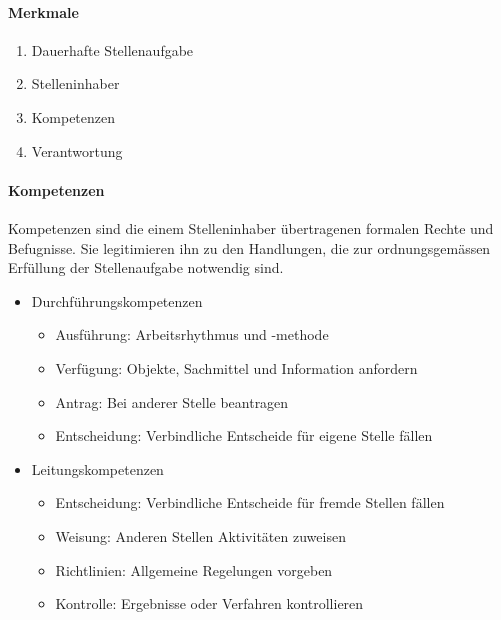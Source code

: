 \paragraph{Merkmale}
\begin{enumerate}
	\item Dauerhafte Stellenaufgabe
	\item Stelleninhaber
	\item Kompetenzen
	\item Verantwortung
\end{enumerate}

\paragraph{Kompetenzen}
Kompetenzen sind die einem Stelleninhaber übertragenen formalen Rechte und Befugnisse. Sie legitimieren ihn zu den
Handlungen, die zur ordnungsgemässen Erfüllung der Stellenaufgabe notwendig sind.
\begin{itemize}
	\item Durchführungskompetenzen
	\begin{itemize}
		\item Ausführung: Arbeitsrhythmus und -methode
		\item Verfügung: Objekte, Sachmittel und Information anfordern
		\item Antrag: Bei anderer Stelle beantragen
		\item Entscheidung: Verbindliche Entscheide für eigene Stelle fällen
	\end{itemize}
	\item Leitungskompetenzen
	\begin{itemize}
		\item Entscheidung: Verbindliche Entscheide für fremde Stellen fällen
		\item Weisung: Anderen Stellen Aktivitäten zuweisen
		\item Richtlinien: Allgemeine Regelungen vorgeben
		\item Kontrolle: Ergebnisse oder Verfahren kontrollieren
	\end{itemize}
\end{itemize}


